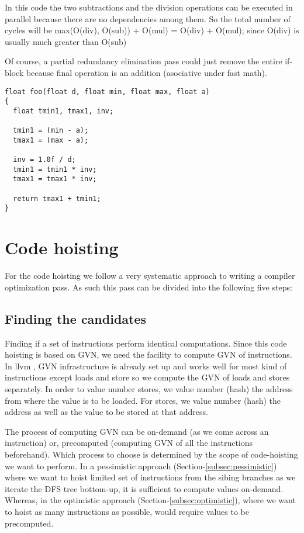 \documentclass{sig-alternate}
\begin{document}
In this code the two subtractions and the division operations can be executed in
parallel because there are no dependencies among them. So the total number of
cycles will be max(O(div), O(sub)) + O(mul) = O(div) + O(mul); since O(div) is
usually much greater than O(sub) \cite{x86,aarch64}

Of course, a partial redundancy elimination pass could just remove the entire
if-block because final operation is an addition (asociative under fast math).

\begin{verbatim}
float foo(float d, float min, float max, float a)
{
  float tmin1, tmax1, inv;

  tmin1 = (min - a);
  tmax1 = (max - a);

  inv = 1.0f / d;
  tmin1 = tmin1 * inv;
  tmax1 = tmax1 * inv;

  return tmax1 + tmin1;
}
\end{verbatim}


\newpage

\section{Code hoisting}
For the code hoisting we follow a very systematic approach to writing a compiler
optimization pass. As such this pass can be divided into the following five
steps:

\subsection{Finding the candidates}
Finding if a set of instructions perform identical computations. Since this code
hoisting is based on GVN, we need the facility to compute GVN of instructions.
In llvm \cite{llvm}, GVN infrastructure is already set up and works well for
most kind of instructions except loads and store so we compute the GVN of loads
and stores separately. In order to value number stores, we value number (hash)
the address from where the value is to be loaded. For stores, we value number
(hash) the address as well as the value to be stored at that address.

The process of computing GVN can be on-demand (as we come across an instruction)
or, precomputed (computing GVN of all the instructions beforehand). Which
process to choose is determined by the scope of code-hoisting we want to
perform. In a pessimistic approach (Section-\ref{subsec:pessimistic}) where we
want to hoist limited set of instructions from the sibing branches as we iterate
the DFS tree bottom-up, it is sufficient to compute values on-demand. Whereas,
in the optimistic approach (Section-\ref{subsec:optimistic}), where we want to
hoist as many instructions as possible, would require values to be precomputed.
\end{document}
